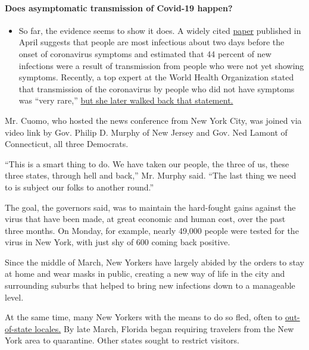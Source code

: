 \begin{itemize}
{  \paragraph{Does asymptomatic transmission of Covid-19
  happen?}\label{does-asymptomatic-transmission-of-covid-19-happen}}

  \begin{itemize}
  \tightlist
  \item
    So far, the evidence seems to show it does. A widely cited
    \href{https://www.nature.com/articles/s41591-020-0869-5}{paper}
    published in April suggests that people are most infectious about
    two days before the onset of coronavirus symptoms and estimated that
    44 percent of new infections were a result of transmission from
    people who were not yet showing symptoms. Recently, a top expert at
    the World Health Organization stated that transmission of the
    coronavirus by people who did not have symptoms was ``very rare,''
    \href{https://www.nytimes.com/2020/06/09/world/coronavirus-updates.html?action=click\&pgtype=Article\&state=default\&region=MAIN_CONTENT_3\&context=storylines_faq\#link-1f302e21}{but
    she later walked back that statement.}
  \end{itemize}
\end{itemize}

Mr. Cuomo, who hosted the news conference from New York City, was joined
via video link by Gov. Philip D. Murphy of New Jersey and Gov. Ned
Lamont of Connecticut, all three Democrats.

``This is a smart thing to do. We have taken our people, the three of
us, these three states, through hell and back,'' Mr. Murphy said. ``The
last thing we need to is subject our folks to another round.''

The goal, the governors said, was to maintain the hard-fought gains
against the virus that have been made, at great economic and human cost,
over the past three months. On Monday, for example, nearly 49,000 people
were tested for the virus in New York, with just shy of 600 coming back
positive.

Since the middle of March, New Yorkers have largely abided by the orders
to stay at home and wear masks in public, creating a new way of life in
the city and surrounding suburbs that helped to bring new infections
down to a manageable level.

At the same time, many New Yorkers with the means to do so fled, often
to
\href{https://www.nytimes.com/interactive/2020/05/16/nyregion/nyc-coronavirus-moving-leaving.html}{out-of-state
locales.} By late March, Florida began requiring travelers from the New
York area to quarantine. Other states sought to restrict visitors.


